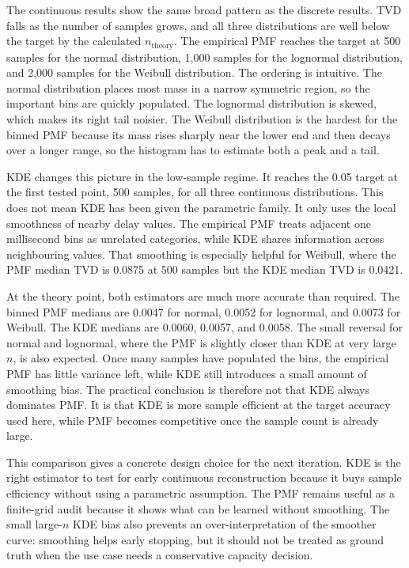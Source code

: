 \documentclass[a4paper,11pt]{report}
\begin{document}
The continuous results show the same broad pattern as the discrete results. TVD falls as the number of samples grows, and all three distributions are well below the target by the calculated \(n_{\mathrm{theory}}\). The empirical PMF reaches the target at 500 samples for the normal distribution, 1,000 samples for the lognormal distribution, and 2,000 samples for the Weibull distribution. The ordering is intuitive. The normal distribution places most mass in a narrow symmetric region, so the important bins are quickly populated. The lognormal distribution is skewed, which makes its right tail noisier. The Weibull distribution is the hardest for the binned PMF because its mass rises sharply near the lower end and then decays over a longer range, so the histogram has to estimate both a peak and a tail.

KDE changes this picture in the low-sample regime. It reaches the 0.05 target at the first tested point, 500 samples, for all three continuous distributions. This does not mean KDE has been given the parametric family. It only uses the local smoothness of nearby delay values. The empirical PMF treats adjacent one millisecond bins as unrelated categories, while KDE shares information across neighbouring values. That smoothing is especially helpful for Weibull, where the PMF median TVD is 0.0875 at 500 samples but the KDE median TVD is 0.0421.

At the theory point, both estimators are much more accurate than required. The binned PMF medians are 0.0047 for normal, 0.0052 for lognormal, and 0.0073 for Weibull. The KDE medians are 0.0060, 0.0057, and 0.0058. The small reversal for normal and lognormal, where the PMF is slightly closer than KDE at very large \(n\), is also expected. Once many samples have populated the bins, the empirical PMF has little variance left, while KDE still introduces a small amount of smoothing bias. The practical conclusion is therefore not that KDE always dominates PMF. It is that KDE is more sample efficient at the target accuracy used here, while PMF becomes competitive once the sample count is already large.

This comparison gives a concrete design choice for the next iteration. KDE is the right estimator to test for early continuous reconstruction because it buys sample efficiency without using a parametric assumption. The PMF remains useful as a finite-grid audit because it shows what can be learned without smoothing. The small large-\(n\) KDE bias also prevents an over-interpretation of the smoother curve: smoothing helps early stopping, but it should not be treated as ground truth when the use case needs a conservative capacity decision.
\end{document}
